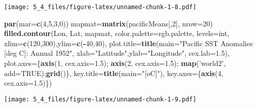\documentclass[]{article}
\newenvironment{Shaded}{\begin{snugshade}}{\end{snugshade}}
\newcommand{\KeywordTok}[1]{\textcolor[rgb]{0.13,0.29,0.53}{\textbf{#1}}}
\newcommand{\DataTypeTok}[1]{\textcolor[rgb]{0.13,0.29,0.53}{#1}}
\newcommand{\DecValTok}[1]{\textcolor[rgb]{0.00,0.00,0.81}{#1}}
\newcommand{\FloatTok}[1]{\textcolor[rgb]{0.00,0.00,0.81}{#1}}
\newcommand{\StringTok}[1]{\textcolor[rgb]{0.31,0.60,0.02}{#1}}
\newcommand{\OtherTok}[1]{\textcolor[rgb]{0.56,0.35,0.01}{#1}}
\newcommand{\OperatorTok}[1]{\textcolor[rgb]{0.81,0.36,0.00}{\textbf{#1}}}
\newcommand{\NormalTok}[1]{#1}
\begin{document}
\texttt{[image: 5\_4\_files/figure-latex/unnamed-chunk-1-8.pdf]}

\begin{Shaded}
\begin{Highlighting}[]
\KeywordTok{par}\NormalTok{(}\DataTypeTok{mar=}\KeywordTok{c}\NormalTok{(}\DecValTok{4}\NormalTok{,}\DecValTok{5}\NormalTok{,}\DecValTok{3}\NormalTok{,}\DecValTok{0}\NormalTok{))}
\NormalTok{mapmat=}\KeywordTok{matrix}\NormalTok{(pacificMeans[,}\DecValTok{2}\NormalTok{], }\DataTypeTok{nrow=}\DecValTok{20}\NormalTok{)}
\KeywordTok{filled.contour}\NormalTok{(Lon, Lat, mapmat, }\DataTypeTok{color.palette=}\NormalTok{rgb.palette, }\DataTypeTok{levels=}\NormalTok{int,}
               \DataTypeTok{xlim=}\KeywordTok{c}\NormalTok{(}\DecValTok{120}\NormalTok{,}\DecValTok{300}\NormalTok{),}\DataTypeTok{ylim=}\KeywordTok{c}\NormalTok{(}\OperatorTok{-}\DecValTok{40}\NormalTok{,}\DecValTok{40}\NormalTok{),}
               \DataTypeTok{plot.title=}\KeywordTok{title}\NormalTok{(}\DataTypeTok{main=}\StringTok{"Pacific SST Anomalies [deg C]: Annual 1952"}\NormalTok{,}
                                \DataTypeTok{xlab=}\StringTok{"Latitude"}\NormalTok{,}\DataTypeTok{ylab=}\StringTok{"Longitude"}\NormalTok{, }\DataTypeTok{cex.lab=}\FloatTok{1.5}\NormalTok{),}
               \DataTypeTok{plot.axes=}\NormalTok{\{}\KeywordTok{axis}\NormalTok{(}\DecValTok{1}\NormalTok{, }\DataTypeTok{cex.axis=}\FloatTok{1.5}\NormalTok{); }\KeywordTok{axis}\NormalTok{(}\DecValTok{2}\NormalTok{, }\DataTypeTok{cex.axis=}\FloatTok{1.5}\NormalTok{);}
                 \KeywordTok{map}\NormalTok{(}\StringTok{'world2'}\NormalTok{, }\DataTypeTok{add=}\OtherTok{TRUE}\NormalTok{);}\KeywordTok{grid}\NormalTok{()\},}
               \DataTypeTok{key.title=}\KeywordTok{title}\NormalTok{(}\DataTypeTok{main=}\StringTok{"[oC]"}\NormalTok{),}
               \DataTypeTok{key.axes=}\NormalTok{\{}\KeywordTok{axis}\NormalTok{(}\DecValTok{4}\NormalTok{, }\DataTypeTok{cex.axis=}\FloatTok{1.5}\NormalTok{)\})}
\end{Highlighting}
\end{Shaded}

\texttt{[image: 5\_4\_files/figure-latex/unnamed-chunk-1-9.pdf]}
\end{document}

